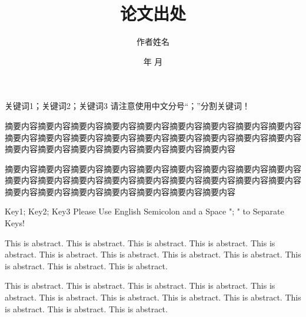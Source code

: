\documentclass[supercite]{HustGraduTrans}
\title{论文出处} %
\author{作者姓名} %
\date{\number\year 年 \number\month 月} %
\begin{document}
    \maketitle
    
    
    
    \begin{cnabstract}{关键词1；关键词2；关键词3}
        请注意使用中文分号“；”分割关键词！
        
        摘要内容摘要内容摘要内容摘要内容摘要内容摘要内容摘要内容摘要内容摘要内容摘要内容摘要内容摘要内容摘要内容摘要内容摘要内容摘要内容摘要内容摘要内容摘要内容摘要内容摘要内容摘要内容摘要内容摘要内容摘要内容
        
        摘要内容摘要内容摘要内容摘要内容摘要内容摘要内容摘要内容摘要内容摘要内容摘要内容摘要内容摘要内容摘要内容摘要内容摘要内容摘要内容摘要内容摘要内容摘要内容摘要内容摘要内容摘要内容摘要内容摘要内容摘要内容
    \end{cnabstract}
    \begin{enabstract}{Key1; Key2; Key3}
        Please Use English Semicolon and a Space "; " to Separate  Keys! 
        
        This is abstract. This is abstract. This is abstract. This is abstract. This is abstract. This is abstract. This is abstract. This is abstract. This is abstract. This is abstract. This is abstract. This is abstract. 
        
        This is abstract. This is abstract. This is abstract. This is abstract. This is abstract. This is abstract. This is abstract. This is abstract. This is abstract. This is abstract. This is abstract. This is abstract. 
    \end{enabstract}
\end{document}
